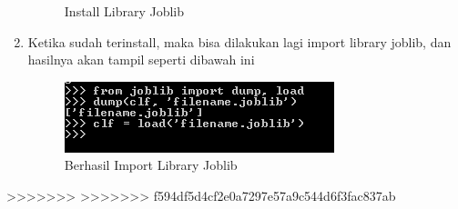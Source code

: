 \begin{enumerate}
\begin{figure}
\begin{center}
\caption{Install Library Joblib}
\end{center}
\end{figure}
\item
Ketika sudah terinstall, maka bisa dilakukan lagi import library joblib, dan hasilnya akan tampil seperti dibawah ini
\begin{figure}
\begin{center}
\includegraphics[scale=1]{figures/hasil3.png}
\caption{Berhasil Import Library Joblib}
\end{center}
\end{figure}
\end{enumerate}




>>>>>>> 
>>>>>>> f594df5d4cf2e0a7297e57a9c544d6f3fac837ab
